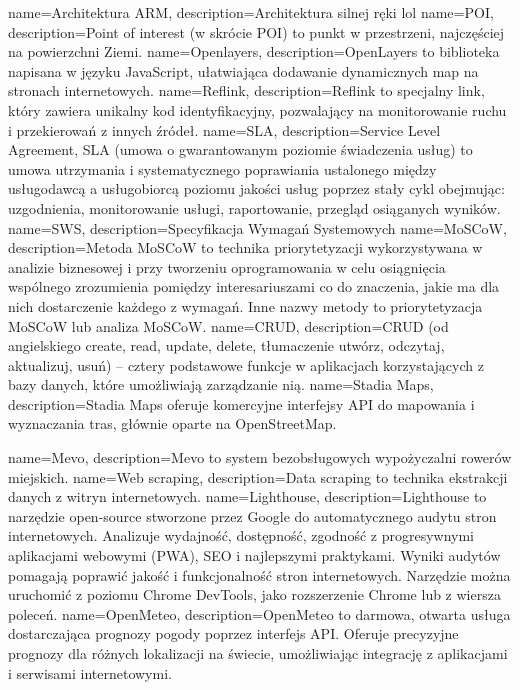 {
    name={Architektura ARM},
    description={Architektura silnej ręki lol}
}
{
    name={POI},
    description={Point of interest (w skrócie POI) to punkt w przestrzeni, najczęściej na powierzchni Ziemi.}
}
{
    name={Openlayers},
    description={OpenLayers to biblioteka napisana w języku JavaScript, ułatwiająca dodawanie dynamicznych map na stronach internetowych.}
}
{
    name={Reflink},
    description={Reflink to specjalny link, który zawiera unikalny kod identyfikacyjny, pozwalający na monitorowanie ruchu i przekierowań z innych źródeł.}
}
{
    name={SLA},
    description={Service Level Agreement, SLA (umowa o gwarantowanym poziomie świadczenia usług) to umowa utrzymania i systematycznego poprawiania ustalonego między usługodawcą a usługobiorcą poziomu jakości usług poprzez stały cykl obejmując: uzgodnienia,
    monitorowanie usługi, raportowanie, przegląd osiąganych wyników.}
}
{
    name={SWS},
    description={Specyfikacja Wymagań Systemowych }
}
{
    name={MoSCoW},
    description={Metoda MoSCoW to technika priorytetyzacji wykorzystywana w analizie biznesowej i przy tworzeniu oprogramowania w celu osiągnięcia wspólnego zrozumienia pomiędzy interesariuszami co do znaczenia, jakie ma dla nich dostarczenie każdego z wymagań. Inne nazwy metody to priorytetyzacja MoSCoW lub analiza MoSCoW.}
}
{
    name={CRUD},
    description={CRUD (od angielskiego create, read, update, delete, tłumaczenie utwórz, odczytaj, aktualizuj, usuń) – cztery podstawowe funkcje w aplikacjach korzystających z bazy danych, które umożliwiają zarządzanie nią.}
}
{
    name={Stadia Maps},
    description={Stadia Maps oferuje komercyjne interfejsy API do mapowania i wyznaczania tras, głównie oparte na OpenStreetMap.}
}

{
    name={Mevo},
    description={Mevo to system bezobsługowych wypożyczalni rowerów miejskich.}
}
{
    name={Web scraping},
    description={Data scraping to technika ekstrakcji danych z witryn internetowych.}
}
{
    name={Lighthouse},
description={Lighthouse to narzędzie open-source stworzone przez Google do automatycznego audytu stron internetowych. Analizuje wydajność, dostępność, zgodność z progresywnymi aplikacjami webowymi (PWA), SEO i najlepszymi praktykami. Wyniki audytów pomagają poprawić jakość i funkcjonalność stron internetowych. Narzędzie można uruchomić z poziomu Chrome DevTools, jako rozszerzenie Chrome lub z wiersza poleceń.}
}
{
    name={OpenMeteo},
description={OpenMeteo to darmowa, otwarta usługa dostarczająca prognozy pogody poprzez interfejs API. Oferuje precyzyjne prognozy dla różnych lokalizacji na świecie, umożliwiając integrację z aplikacjami i serwisami internetowymi.}
}